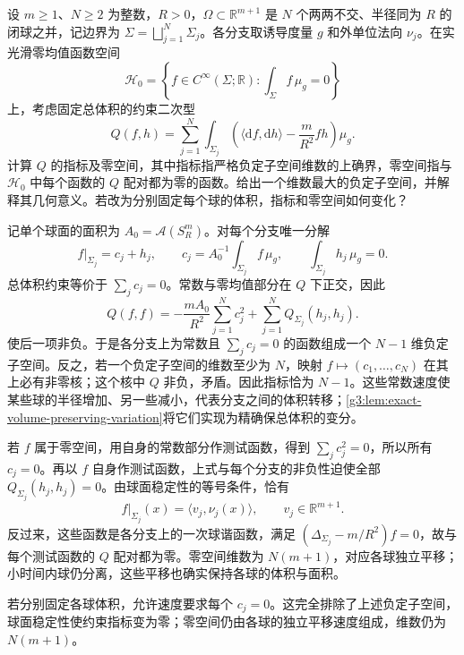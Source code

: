 \begin{optionalexercise}\label{g3:ex:cmc-disconnected-balls}
	设 \(m\ge1\)、\(N\ge2\) 为整数，\(R>0\)，\(\Omega\subset\mathbb R^{m+1}\) 是 \(N\) 个两两不交、半径同为 \(R\) 的闭球之并，记边界为 \(\Sigma=\bigsqcup_{j=1}^N\Sigma_j\)。各分支取诱导度量 \(g\) 和外单位法向 \(\nu_j\)。在实光滑零均值函数空间
	\[
		\mathcal H_0=\left\{f\in C^\infty(\Sigma;\mathbb R):
		\int_\Sigma f\,\mu_g=0\right\}
	\]
	上，考虑固定总体积的约束二次型
	\[
		Q(f,h)=\sum_{j=1}^N\int_{\Sigma_j}
		\left(\langle\mathrm df,\mathrm dh\rangle-\frac m{R^2}fh\right)\mu_g.
	\]
	计算 \(Q\) 的指标及零空间，其中指标指严格负定子空间维数的上确界，零空间指与 \(\mathcal H_0\) 中每个函数的 \(Q\) 配对都为零的函数。给出一个维数最大的负定子空间，并解释其几何意义。若改为分别固定每个球的体积，指标和零空间如何变化？
\end{optionalexercise}
\begin{solution}
	记单个球面的面积为 \(A_0=\mathcal A(S_R^m)\)。对每个分支唯一分解
	\[
		f|_{\Sigma_j}=c_j+h_j,\qquad
		c_j=A_0^{-1}\int_{\Sigma_j}f\,\mu_g,\qquad
		\int_{\Sigma_j}h_j\,\mu_g=0.
	\]
	总体积约束等价于 \(\sum_jc_j=0\)。常数与零均值部分在 \(Q\) 下正交，因此
	\[
		Q(f,f)=-\frac{mA_0}{R^2}\sum_{j=1}^Nc_j^2
		+\sum_{j=1}^NQ_{\Sigma_j}(h_j,h_j).
	\]
	使后一项非负。于是各分支上为常数且 \(\sum_jc_j=0\) 的函数组成一个 \(N-1\) 维负定子空间。反之，若一个负定子空间的维数至少为 \(N\)，映射 \(f\mapsto(c_1,\ldots,c_N)\) 在其上必有非零核；这个核中 \(Q\) 非负，矛盾。因此指标恰为 \(N-1\)。这些常数速度使某些球的半径增加、另一些减小，代表分支之间的体积转移；\cref{g3:lem:exact-volume-preserving-variation}将它们实现为精确保总体积的变分。

	若 \(f\) 属于零空间，用自身的常数部分作测试函数，得到 \(\sum_jc_j^2=0\)，所以所有 \(c_j=0\)。再以 \(f\) 自身作测试函数，上式与每个分支的非负性迫使全部 \(Q_{\Sigma_j}(h_j,h_j)=0\)。由球面稳定性的等号条件，恰有
	\[
		f|_{\Sigma_j}(x)=\langle v_j,\nu_j(x)\rangle,
		\qquad v_j\in\mathbb R^{m+1}.
	\]
	反过来，这些函数是各分支上的一次球谐函数，满足 \((\Delta_{\Sigma_j}-m/R^2)f=0\)，故与每个测试函数的 \(Q\) 配对都为零。零空间维数为 \(N(m+1)\)，对应各球独立平移；小时间内球仍分离，这些平移也确实保持各球的体积与面积。

	若分别固定各球体积，允许速度要求每个 \(c_j=0\)。这完全排除了上述负定子空间，球面稳定性使约束指标变为零；零空间仍由各球的独立平移速度组成，维数仍为 \(N(m+1)\)。
\end{solution}

